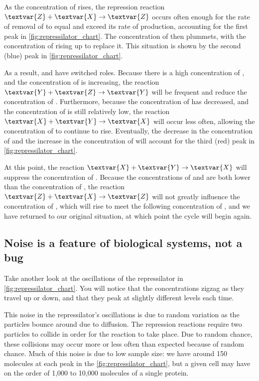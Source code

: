 As the concentration of  rises, the repression reaction $\textvar{Z} + \textvar{X} \rightarrow \textvar{Z}$ occurs often enough for the rate of removal of  to equal and exceed its rate of production, accounting for the first peak in \autoref{fig:repressilator_chart}. The concentration of  then plummets, with the concentration of  rising up to replace it. This situation is shown by the second (blue) peak in \autoref{fig:repressilator_chart}.

As a result,  and  have switched roles. Because there is a high concentration of , and the concentration of  is increasing, the reaction $\textvar{Y} + \textvar{Z} \rightarrow \textvar{Y}$ will be frequent and reduce the concentration of . Furthermore, because the concentration of  has decreased, and the concentration of  is still relatively low, the reaction $\textvar{X} + \textvar{Y} \rightarrow \textvar{X}$ will occur less often, allowing the concentration of  to continue to rise. Eventually, the decrease in the concentration of  and the increase in the concentration of  will account for the third (red) peak in \autoref{fig:repressilator_chart}.

At this point, the reaction $\textvar{X} + \textvar{Y} \rightarrow \textvar{X}$ will suppress the concentration of . Because the concentrations of  and  are both lower than the concentration of , the reaction $\textvar{Z} + \textvar{X} \rightarrow \textvar{Z}$ will not greatly influence the concentration of , which will rise to meet the following concentration of , and we have returned to our original situation, at which point the cycle will begin again.

\FloatBarrier
{}
\subsection{Noise is a feature of biological systems, not a bug}

Take another look at the oscillations of the repressilator in \autoref{fig:repressilator_chart}. You will notice that the concentrations zigzag as they travel up or down, and that they peak at slightly different levels each time.

This noise in the repressilator's oscillations is due to random variation as the particles bounce around due to diffusion. The repression reactions require two particles to collide in order for the reaction to take place. Due to random chance, these collisions may occur more or less often than expected because of random chance. Much of this noise is due to low sample size: we have around 150 molecules at each peak in the \autoref{fig:repressilator_chart}, but a given cell may have on the order of 1,000 to 10,000 molecules of a single protein.

